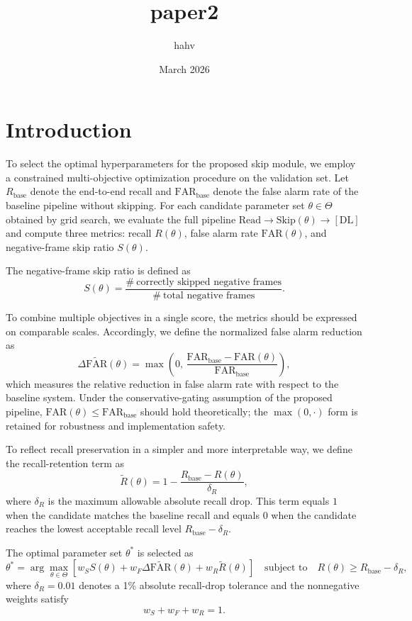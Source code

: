 \documentclass{article}
\title{paper2}
\author{hahv}
\date{March 2026}
\begin{document}
	\maketitle

	\section{Introduction}

	To select the optimal hyperparameters for the proposed skip module, we employ a constrained multi-objective optimization procedure on the validation set. Let $R_{\text{base}}$ denote the end-to-end recall and $\mathrm{FAR}_{\text{base}}$ denote the false alarm rate of the baseline pipeline without skipping. For each candidate parameter set $\theta \in \Theta$ obtained by grid search, we evaluate the full pipeline $\text{Read} \rightarrow \text{Skip}(\theta) \rightarrow [\text{DL}]$ and compute three metrics: recall $R(\theta)$, false alarm rate $\mathrm{FAR}(\theta)$, and negative-frame skip ratio $S(\theta)$.

	The negative-frame skip ratio is defined as
	\[
	S(\theta)=
	\frac{\#\ \text{correctly skipped negative frames}}
	{\#\ \text{total negative frames}}.
	\]

	To combine multiple objectives in a single score, the metrics should be expressed on comparable scales. Accordingly, we define the normalized false alarm reduction as
	\[
	\Delta \widetilde{\mathrm{FAR}}(\theta)=
	\max\left(
	0,\,
	\frac{\mathrm{FAR}_{\text{base}}-\mathrm{FAR}(\theta)}
	{\mathrm{FAR}_{\text{base}}}
	\right),
	\]
	which measures the relative reduction in false alarm rate with respect to the baseline system. Under the conservative-gating assumption of the proposed pipeline, $\mathrm{FAR}(\theta)\leq \mathrm{FAR}_{\text{base}}$ should hold theoretically; the $\max(0,\cdot)$ form is retained for robustness and implementation safety.

	To reflect recall preservation in a simpler and more interpretable way, we define the recall-retention term as
	\[
	\widetilde{R}(\theta)=
	1-\frac{R_{\text{base}}-R(\theta)}{\delta_R},
	\]
	where $\delta_R$ is the maximum allowable absolute recall drop. This term equals $1$ when the candidate matches the baseline recall and equals $0$ when the candidate reaches the lowest acceptable recall level $R_{\text{base}}-\delta_R$.

	The optimal parameter set $\theta^*$ is selected as
	\[
	\theta^*=
	\arg\max_{\theta \in \Theta}
	\left[
	w_S S(\theta)
	+
	w_F \Delta \widetilde{\mathrm{FAR}}(\theta)
	+
	w_R \widetilde{R}(\theta)
	\right]
	\quad
	\text{subject to}
	\quad
	R(\theta)\geq R_{\text{base}}-\delta_R,
	\]
	where $\delta_R=0.01$ denotes a 1\% absolute recall-drop tolerance and the nonnegative weights satisfy
	\[
	w_S+w_F+w_R=1.
	\]
\end{document}
